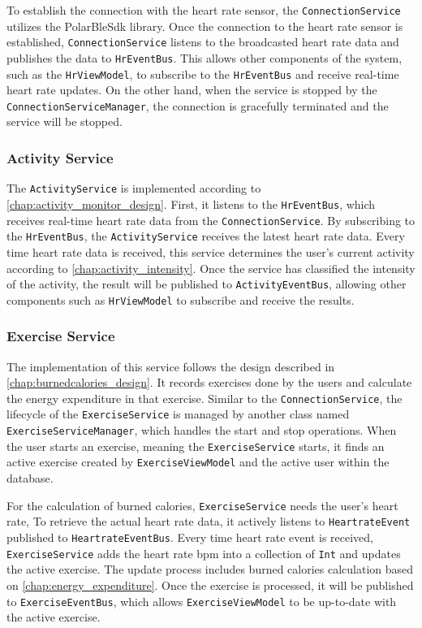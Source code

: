 To establish the connection with the heart rate sensor, the \verb;ConnectionService; utilizes the PolarBleSdk library.
Once the connection to the heart rate sensor is established, \verb;ConnectionService; listens to the broadcasted heart rate data and publishes the data to \verb;HrEventBus;.
This allows other components of the system, such as the \verb;HrViewModel;, to subscribe to the \verb;HrEventBus; and receive real-time heart rate updates. 
On the other hand, when the service is stopped by the \verb;ConnectionServiceManager;, the connection is gracefully terminated and the service will be stopped.

\subsubsection{Activity Service}
The \verb;ActivityService; is implemented according to \autoref{chap:activity_monitor_design}.
First, it listens to the \verb;HrEventBus;, which receives real-time heart rate data from the \verb;ConnectionService;. 
By subscribing to the \verb;HrEventBus;, the \verb;ActivityService; receives the latest heart rate data.
Every time heart rate data is received, this service determines the user's current activity according to \autoref{chap:activity_intensity}.
Once the service has classified the intensity of the activity, the result will be published to \verb;ActivityEventBus;, allowing other components such as \verb;HrViewModel; to subscribe and receive the results.

\subsubsection{Exercise Service}
The implementation of this service follows the design described in \autoref{chap:burnedcalories_design}.
It records exercises done by the users and calculate the energy expenditure in that exercise.
Similar to the \verb;ConnectionService;, the lifecycle of the \verb;ExerciseService; is managed by another class named \verb;ExerciseServiceManager;, which handles the start and stop operations. 
When the user starts an exercise, meaning the \texttt{ExerciseService} starts, it finds an active exercise created by \texttt{ExerciseViewModel} and the active user within the database. 

For the calculation of burned calories, \verb;ExerciseService; needs the user's heart rate, To retrieve the actual heart rate data, it actively listens to \verb;HeartrateEvent; published to \verb;HeartrateEventBus;.
Every time heart rate event is received, \verb;ExerciseService; adds the heart rate bpm into a collection of \verb;Int; and updates the active exercise. The update process includes burned calories calculation based on \autoref{chap:energy_expenditure}. 
Once the exercise is processed, it will be published to \verb;ExerciseEventBus;, which allows \verb;ExerciseViewModel; to be up-to-date with the active exercise.

